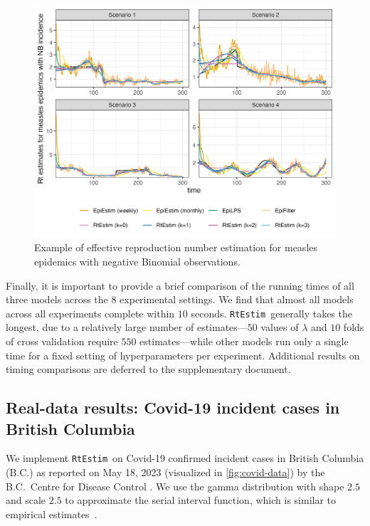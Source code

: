\documentclass[10pt,letterpaper]{article}
\def\RtEstim{\texttt{RtEstim}}
\newcommand{\citep}[1]{\cite{#1}}
\begin{document}
\begin{figure}[!ht]
  \centering
  \includegraphics*[width=.99\textwidth]{fig/fig_res_NB_measles.png}
  \caption{Example of effective reproduction number estimation for measles epidemics with negative
  Binomial observations.}
  \label{fig:nb-est-measles}
\end{figure}

Finally, it is important to provide a brief comparison of the running times of
all three models across the $8$ experimental settings. We find that almost all
models across all experiments complete within $10$ seconds. \RtEstim\ generally
takes the longest, due to a relatively large number of estimates---$50$ values
of $\lambda$ and $10$ folds of cross validation require $550$ estimates---while
other models run only a single time for a fixed setting of hyperparameters per
experiment. Additional results on timing comparisons are deferred to the
supplementary document. 


\subsection{Real-data results: Covid-19 incident cases in British Columbia}

We implement \RtEstim\ on Covid-19 confirmed incident cases in British Columbia
(B.C.) as reported on May 18, 2023 (visualized in \autoref{fig:covid-data}) by
the B.C.\ Centre for Disease Control \citep{covidbc}. We use the gamma distribution with shape
$2.5$ and scale $2.5$ to approximate the serial interval function, which is
similar to empirical estimates~\citep{lehtinen2021relationship}. 
\end{document}
